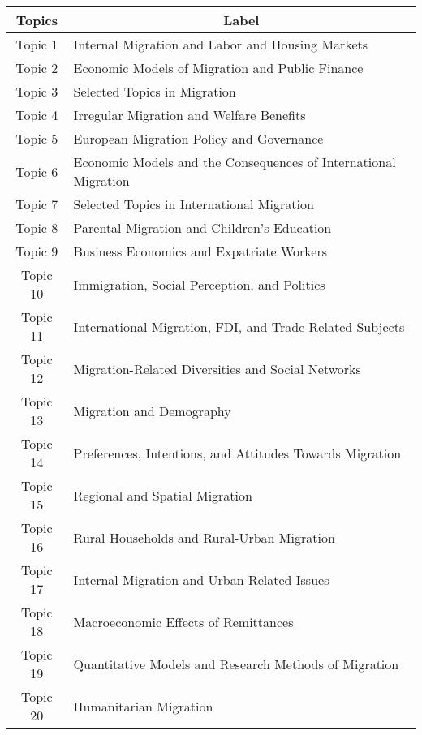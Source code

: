 \begin{table}[ht!]
\centering
\begin{tabular}{@{}cl@{}}
\toprule
\textbf{Topics} & \multicolumn{1}{c}{\textbf{Label}}                                          \\ \midrule
Topic 1         & Internal Migration and Labor and Housing Markets         \\
Topic 2         & Economic Models of Migration and Public Finance          \\
Topic 3         & Selected Topics in Migration                             \\
Topic 4         & Irregular Migration and Welfare Benefits                 \\
Topic 5         & European Migration Policy and Governance                 \\
Topic 6         & Economic Models and the Consequences of International Migration           \\
Topic 7         & Selected Topics in International Migration               \\
Topic 8         & Parental Migration and Children's Education              \\
Topic 9         & Business Economics and Expatriate Workers                \\
Topic 10        & Immigration, Social Perception, and Politics             \\
Topic 11        & International Migration, FDI, and Trade-Related Subjects \\
Topic 12        & Migration-Related Diversities and Social Networks        \\
Topic 13        & Migration and Demography                                 \\
Topic 14        & Preferences, Intentions, and Attitudes Towards Migration \\
Topic 15        & Regional and Spatial Migration                           \\
Topic 16        & Rural Households and Rural-Urban Migration               \\
Topic 17        & Internal Migration and Urban-Related Issues              \\
Topic 18        & Macroeconomic Effects of Remittances                     \\
Topic 19        & Quantitative Models and Research Methods of Migration    \\
Topic 20        & Humanitarian Migration                                   \\

\end{tabular}
\end{table}
